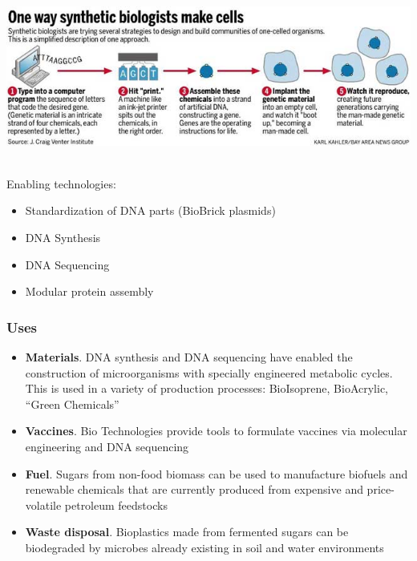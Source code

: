\documentclass{beamer}
\begin{document}
\begin{frame}
	\includegraphics[scale=.5]{cell_synthesis}
	
	\\ Enabling technologies:
	\begin{itemize}
		\item Standardization of DNA parts (BioBrick plasmids)
		\item DNA Synthesis
		\item DNA Sequencing
		\item Modular protein assembly
	\end{itemize}
\end{frame}
\begin{frame}
	\frametitle{Uses}
	
	\begin{itemize}
		\item \textbf{Materials}.  DNA synthesis and DNA sequencing have enabled the construction of microorganisms with specially engineered metabolic cycles. This is used in a variety of production processes: BioIsoprene, BioAcrylic, ``Green Chemicals''
		\item \textbf{Vaccines}. Bio Technologies provide tools to formulate vaccines via molecular engineering and DNA sequencing
		\item \textbf{Fuel}. Sugars from non-food biomass can be used to manufacture biofuels and renewable chemicals that are currently produced from expensive and price-volatile petroleum feedstocks
		\item \textbf{Waste disposal}. Bioplastics made from fermented sugars can be biodegraded by microbes already existing in soil and water environments
	\end{itemize}
\end{frame}
\end{document}

